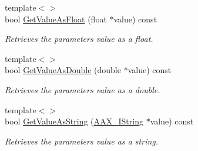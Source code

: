 \begin{DoxyCompactItemize}
{\footnotesize template$<$$>$ }\\bool \hyperlink{a00035_a8484adc259a40c25ac8414eac475eea3}{Get\+Value\+As\+Float} (float $\ast$value) const
\begin{DoxyCompactList}\small\item\em Retrieves the parameter\textquotesingle{}s value as a float. \end{DoxyCompactList}\item 
{\footnotesize template$<$$>$ }\\bool \hyperlink{a00035_a1bb6bad348b137dd413abedd1de0c9ea}{Get\+Value\+As\+Double} (double $\ast$value) const
\begin{DoxyCompactList}\small\item\em Retrieves the parameter\textquotesingle{}s value as a double. \end{DoxyCompactList}\item 
{\footnotesize template$<$$>$ }\\bool \hyperlink{a00035_a96661507efdc490252bbfebe5d716c65}{Get\+Value\+As\+String} (\hyperlink{a00113}{A\+A\+X\+\_\+\+I\+String} $\ast$value) const
\begin{DoxyCompactList}\small\item\em Retrieves the parameter\textquotesingle{}s value as a string. \end{DoxyCompactList}\end{DoxyCompactItemize}
